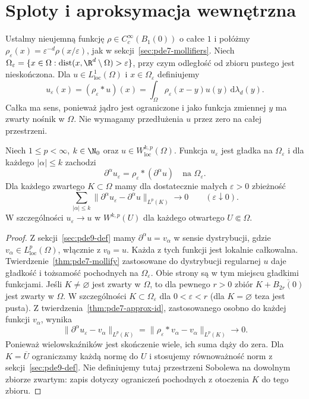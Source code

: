 \section{Sploty i aproksymacja wewnętrzna}
\label{sec:pde9-mollify}

Ustalmy nieujemną funkcję $\rho\in C_c^\infty(B_1(0))$
o całce $1$ i połóżmy
$\rho_\varepsilon(x)=\varepsilon^{-d}\rho(x/\varepsilon)$,
jak w sekcji~\ref{sec:pde7-mollifiers}.
Niech $\Omega_\varepsilon=\{x\in\Omega:
\operatorname{dist}(x,\R^d\setminus\Omega)>\varepsilon\}$,
przy czym odległość od zbioru pustego jest nieskończona.
Dla $u\in L^1_{\mathrm{loc}}(\Omega)$ i $x\in\Omega_\varepsilon$
definiujemy
\[
 u_\varepsilon(x)=(\rho_\varepsilon*u)(x)
 =\int_\Omega \rho_\varepsilon(x-y)u(y)\,\mathrm d\lambda_d(y).
\]
Całka ma sens, ponieważ jądro jest ograniczone
i jako funkcja zmiennej $y$ ma zwarty nośnik w $\Omega$.
Nie wymagamy przedłużenia $u$ przez zero na całej przestrzeni.

\begin{twierdzenie}
\label{thm:pde9-mollify}
Niech $1\le p<\infty$, $k\in\N_0$ oraz
$u\in W^{k,p}_{\mathrm{loc}}(\Omega)$.
Funkcja $u_\varepsilon$ jest gładka na $\Omega_\varepsilon$
i dla każdego $|\alpha|\le k$ zachodzi
\[
 \partial^\alpha u_\varepsilon
 =\rho_\varepsilon*(\partial^\alpha u)
 \quad\text{na }\Omega_\varepsilon.
\]
Dla każdego zwartego $K\subset\Omega$ mamy dla
dostatecznie małych $\varepsilon>0$ zbieżność
\[
 \sum_{|\alpha|\le k}
 \|\partial^\alpha u_\varepsilon-\partial^\alpha u\|_{L^p(K)}
 \longrightarrow0\qquad(\varepsilon\downarrow0).
\]
W szczególności $u_\varepsilon\to u$ w $W^{k,p}(U)$
dla każdego otwartego $U\Subset\Omega$.
\end{twierdzenie}
\begin{proof}
Z sekcji~\ref{sec:pde9-def} mamy
$\partial^\alpha u=v_\alpha$ w sensie dystrybucji,
gdzie $v_\alpha\in L^p_{\mathrm{loc}}(\Omega)$,
włącznie z $v_0=u$. Każda z tych funkcji jest lokalnie
całkowalna. Twierdzenie~\ref{thm:pde7-mollify}
zastosowane do dystrybucji regularnej $u$ daje
gładkość i tożsamość pochodnych na $\Omega_\varepsilon$.
Obie strony są w tym miejscu gładkimi funkcjami.
Jeśli $K\ne\varnothing$ jest zwarty w $\Omega$,
to dla pewnego $r>0$ zbiór
$K+\overline{B_{2r}(0)}$ jest zwarty w $\Omega$.
W szczególności $K\subset\Omega_\varepsilon$ dla
$0<\varepsilon<r$ (dla $K=\varnothing$ teza jest pusta).
Z twierdzenia~\ref{thm:pde7-approx-id}, zastosowanego
osobno do każdej funkcji $v_\alpha$, wynika
\[
 \|\partial^\alpha u_\varepsilon-v_\alpha\|_{L^p(K)}
 =\|\rho_\varepsilon*v_\alpha-v_\alpha\|_{L^p(K)}
 \longrightarrow0.
\]
Ponieważ wielowskaźników jest skończenie wiele,
ich suma dąży do zera. Dla $K=\overline U$ ograniczamy
każdą normę do $U$ i stosujemy równoważność norm
z sekcji~\ref{sec:pde9-def}.
Nie definiujemy tutaj przestrzeni Sobolewa na dowolnym
zbiorze zwartym: zapis dotyczy ograniczeń pochodnych
z otoczenia $K$ do tego zbioru.
\end{proof}

